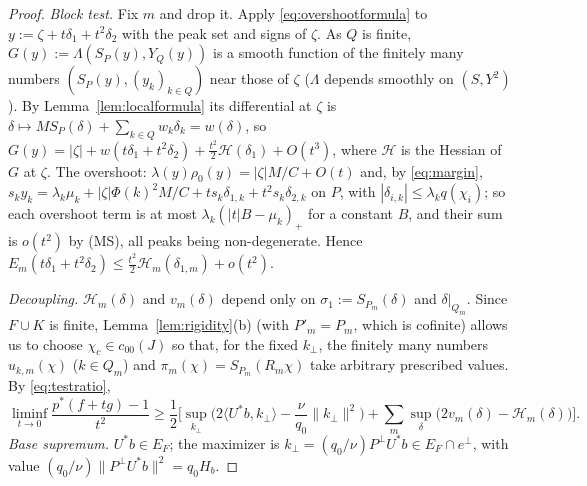 \documentclass[10pt]{amsart}
\theoremstyle{definition}
\theoremstyle{remark}
\newcommand{\ip}[2]{\langle #1,#2\rangle}
\begin{document}
\begin{proof}
\emph{Block test.}  Fix $m$ and drop it.  Apply \eqref{eq:overshootformula}
to $y:=\zeta+t\delta_1+t^2\delta_2$ with the peak set and signs of $\zeta$.
As $Q$ is finite, $G(y):=\Lambda(S_P(y),Y_Q(y))$ is a smooth function of the
finitely many numbers $(S_P(y),(y_k)_{k\in Q})$ near those of $\zeta$
($\Lambda$ depends smoothly on $(S,Y^2)$).  By Lemma~\ref{lem:localformula}
its differential at $\zeta$ is $\delta\mapsto MS_P(\delta)+\sum_{k\in
Q}w_k\delta_k=w(\delta)$, so
$G(y)=|\zeta|+w(t\delta_1+t^2\delta_2)+\frac{t^2}2\mathcal H(\delta_1)+
O(t^3)$, where $\mathcal H$ is the Hessian of $G$ at $\zeta$.  The overshoot:
$\lambda(y)\rho_0(y)=|\zeta|M/C+O(t)$ and, by \eqref{eq:margin},
$s_ky_k=\lambda_k\mu_k+|\zeta|\Phi(k)^2M/C+ts_k\delta_{1,k}+t^2s_k
\delta_{2,k}$ on $P$, with $|\delta_{i,k}|\le\lambda_kq(\chi_i)$; so each
overshoot term is at most $\lambda_k(|t|B-\mu_k)_+$ for a constant $B$,
and their sum is $o(t^2)$ by (MS), all peaks being non-degenerate.  Hence
$E_m(t\delta_1+t^2\delta_2)\le\frac{t^2}2\mathcal H_m(\delta_{1,m})+o(t^2)$.

\emph{Decoupling.}  $\mathcal H_m(\delta)$ and $v_m(\delta)$ depend only on
$\sigma_1:=S_{P_m}(\delta)$ and $\delta|_{Q_m}$.  Since $F\cup K$ is finite,
Lemma~\ref{lem:rigidity}(b) (with $P'_m=P_m$, which is cofinite) allows us to
choose $\chi_c\in c_{00}(J)$ so that, for the fixed $k_\perp$, the finitely
many numbers $u_{k,m}(\chi)$ ($k\in Q_m$) and $\pi_m(\chi)=S_{P_m}(R_m\chi)$
take arbitrary prescribed values.  By \eqref{eq:testratio},
\[
 \liminf_{t\to0}\frac{p^*(f+tg)-1}{t^2}\ge\frac12\Big[\sup_{k_\perp}
 \Big(2\ip{U^*b}{k_\perp}-\frac{\nu}{q_0}\|k_\perp\|^2\Big)+\sum_m
 \sup_{\delta}\big(2v_m(\delta)-\mathcal H_m(\delta)\big)\Big].
\]
\emph{Base supremum.}  $U^*b\in E_F$; the maximizer is
$k_\perp=(q_0/\nu)P^\perp U^*b\in E_F\cap e^\perp$, with value
$(q_0/\nu)\|P^\perp U^*b\|^2=q_0H_b$.


\end{proof}
\end{document}
